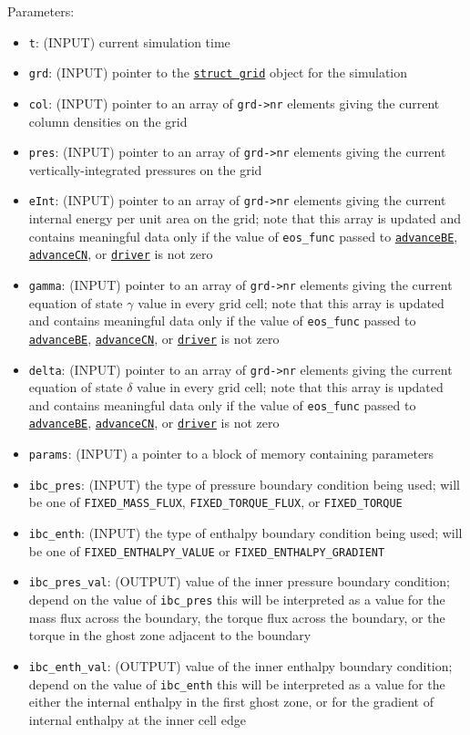 \documentclass[12pt]{article}
\begin{document}
Parameters:
\begin{itemize}
\item \texttt{t}: (INPUT) current simulation time
\item \texttt{grd}: (INPUT) pointer to the \hyperref[sssec:datastructures]{\texttt{struct grid}} object for the simulation
\item \texttt{col}: (INPUT) pointer to an array of \texttt{grd->nr} elements giving the current column densities on the grid
\item \texttt{pres}: (INPUT) pointer to an array of \texttt{grd->nr} elements giving the current vertically-integrated pressures on the grid
\item \texttt{eInt}: (INPUT) pointer to an array of \texttt{grd->nr} elements giving the current internal energy per unit area on the grid; note that this array is updated and contains meaningful data only if the value of \verb=eos_func= passed to \hyperref[sssec:advanceBE]{\texttt{advanceBE}}, \hyperref[sssec:advanceCN]{\texttt{advanceCN}}, or \hyperref[sssec:driver]{\texttt{driver}} is not zero
\item \texttt{gamma}: (INPUT) pointer to an array of \texttt{grd->nr} elements giving the current equation of state $\gamma$ value in every grid cell; note that this array is updated and contains meaningful data only if the value of \verb=eos_func= passed to \hyperref[sssec:advanceBE]{\texttt{advanceBE}}, \hyperref[sssec:advanceCN]{\texttt{advanceCN}}, or \hyperref[sssec:driver]{\texttt{driver}} is not zero
\item \texttt{delta}: (INPUT) pointer to an array of \texttt{grd->nr} elements giving the current equation of state $\delta$ value in every grid cell; note that this array is updated and contains meaningful data only if the value of \verb=eos_func= passed to \hyperref[sssec:advanceBE]{\texttt{advanceBE}}, \hyperref[sssec:advanceCN]{\texttt{advanceCN}}, or \hyperref[sssec:driver]{\texttt{driver}} is not zero
\item \texttt{params}: (INPUT) a pointer to a block of memory containing parameters
\item \verb=ibc_pres=: (INPUT) the type of pressure boundary condition being used; will be one of \verb=FIXED_MASS_FLUX=, \verb=FIXED_TORQUE_FLUX=, or \verb=FIXED_TORQUE=
\item \verb=ibc_enth=: (INPUT) the type of enthalpy boundary condition being used; will be one of \verb=FIXED_ENTHALPY_VALUE= or \verb=FIXED_ENTHALPY_GRADIENT=
\item \verb=ibc_pres_val=: (OUTPUT) value of the inner pressure boundary condition; depend on the value of \verb=ibc_pres= this will be interpreted as a value for the mass flux across the boundary, the torque flux across the boundary, or the torque in the ghost zone adjacent to the boundary
\item \verb=ibc_enth_val=: (OUTPUT) value of the inner enthalpy boundary condition; depend on the value of \verb=ibc_enth= this will be interpreted as a value for the either the internal enthalpy in the first ghost zone, or for the gradient of internal enthalpy at the inner cell edge
\end{itemize}
\end{document}
